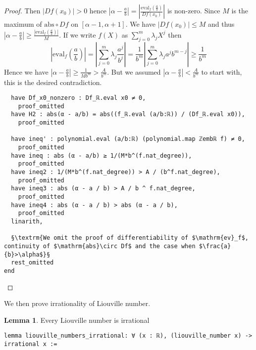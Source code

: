 \documentclass{report}
\theoremstyle{definition}
\newtheorem{lemma}{Lemma}[section]
\theoremstyle{plain}
\begin{document}
\begin{proof}
Then $|Df(x_0)|>0$ hence $\left|\alpha-\frac ab\right|=\left|\frac{\mathrm{eval}_f(\frac a b)}{Df(x_0)}\right|$ is non-zero. Since $M$ is the maximum of $\mathrm{abs}\circ Df$ on $[\alpha-1,\alpha+1]$. We have $|Df(x_0)|\le M$ and thus $\left|\alpha-\frac ab\right|\ge \frac{|\mathrm{eval}_f(\frac a b)|}{M}$. If we write $f(X)$ as $\sum_{j=0}^m \lambda_j X^j$ then
\begin{equation*}
\left|\mathrm{eval}_f\left(\frac a b\right)\right|=\left|\sum_{j=0}^m\lambda_j \frac{a^j}{b^j}\right|= \frac1{b^m}\left|\sum_{j=0}^m\lambda_j a^jb^{m-j}\right|\ge\frac1{b^m}
\end{equation*}
Hence we have $\left|\alpha-\frac a b\right|\ge \frac1{Mb^m}>\frac{A}{b^m}$. But we assumed $\left|\alpha-\frac ab\right|<\frac A{b^m}$ to start with, this is the desired contradiction.

\begin{verbatim}
  have Df_x0_nonzero : Df_ℝ.eval x0 ≠ 0,
    proof_omitted
  have H2 : abs(α - a/b) = abs((f_ℝ.eval (a/b:ℝ)) / (Df_ℝ.eval x0)),
    proof_omitted

  have ineq' : polynomial.eval (a/b:ℝ) (polynomial.map ℤembℝ f) ≠ 0,
    proof_omitted
  have ineq : abs (α - a/b) ≥ 1/(M*b^(f.nat_degree)),
    proof_omitted
  have ineq2 : 1/(M*b^(f.nat_degree)) > A / (b^f.nat_degree),
    proof_omitted
  have ineq3 : abs (α - a / b) > A / b ^ f.nat_degree,
    proof_omitted
  have ineq4 : abs (α - a / b) > abs (α - a / b),
    proof_omitted 
  linarith,
  
  §\textrm{We omit the proof of differentiability of $\mathrm{ev}_f$, continuity of $\mathrm{abs}\circ Df$ and the case when $\frac{a}{b}>\alpha$}§
  rest_omitted
end
\end{verbatim}
\end{proof}

We then prove irrationality of Liouville number. 
\begin{lemma}
Every Liouville number is irrational
\begin{verbatim} 
lemma liouville_numbers_irrational: ∀ (x : ℝ), (liouville_number x) -> irrational x :=
\end{verbatim}
\end{lemma}
\end{document}
